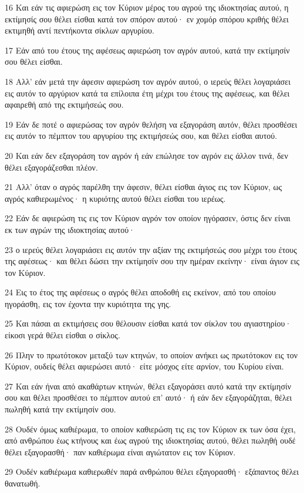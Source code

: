 \par 16 Και εάν τις αφιερώση εις τον Κύριον μέρος του αγρού της ιδιοκτησίας αυτού, η εκτίμησίς σου θέλει είσθαι κατά τον σπόρον αυτού· εν χομόρ σπόρου κριθής θέλει εκτιμηθή αντί πεντήκοντα σίκλων αργυρίου.
\par 17 Εάν από του έτους της αφέσεως αφιερώση τον αγρόν αυτού, κατά την εκτίμησίν σου θέλει είσθαι.
\par 18 Αλλ' εάν μετά την άφεσιν αφιερώση τον αγρόν αυτού, ο ιερεύς θέλει λογαριάσει εις αυτόν το αργύριον κατά τα επίλοιπα έτη μέχρι του έτους της αφέσεως, και θέλει αφαιρεθή από της εκτιμήσεώς σου.
\par 19 Εάν δε ποτέ ο αφιερώσας τον αγρόν θελήση να εξαγοράση αυτόν, θέλει προσθέσει εις αυτόν το πέμπτον του αργυρίου της εκτιμήσεώς σου, και θέλει είσθαι αυτού.
\par 20 Και εάν δεν εξαγοράση τον αγρόν ή εάν επώλησε τον αγρόν εις άλλον τινά, δεν θέλει εξαγοράζεσθαι πλέον.
\par 21 Αλλ' όταν ο αγρός παρέλθη την άφεσιν, θέλει είσθαι άγιος εις τον Κύριον, ως αγρός καθιερωμένος· η κυριότης αυτού θέλει είσθαι του ιερέως.
\par 22 Εάν δε αφιερώση τις εις τον Κύριον αγρόν τον οποίον ηγόρασεν, όστις δεν είναι εκ των αγρών της ιδιοκτησίας αυτού·
\par 23 ο ιερεύς θέλει λογαριάσει εις αυτόν την αξίαν της εκτιμήσεώς σου μέχρι του έτους της αφέσεως· και θέλει δώσει την εκτίμησίν σου την ημέραν εκείνην· είναι άγιον εις τον Κύριον.
\par 24 Εις το έτος της αφέσεως ο αγρός θέλει αποδοθή εις εκείνον, από του οποίου ηγοράσθη, εις τον έχοντα την κυριότητα της γης.
\par 25 Και πάσαι αι εκτιμήσεις σου θέλουσιν είσθαι κατά τον σίκλον του αγιαστηρίου· είκοσι γερά θέλει είσθαι ο σίκλος.
\par 26 Πλην το πρωτότοκον μεταξύ των κτηνών, το οποίον ανήκει ως πρωτότοκον εις τον Κύριον, ουδείς θέλει αφιερώσει αυτό· είτε μόσχος είτε αρνίον, του Κυρίου είναι.
\par 27 Και εάν ήναι από ακαθάρτων κτηνών, θέλει εξαγοράσει αυτό κατά την εκτίμησίν σου και θέλει προσθέσει το πέμπτον αυτού επ' αυτό· ή εάν δεν εξαγοράζηται, θέλει πωληθή κατά την εκτίμησίν σου.
\par 28 Ουδέν όμως καθιέρωμα, το οποίον καθιερώση τις εις τον Κύριον εκ των όσα έχει, από ανθρώπου έως κτήνους και έως αγρού της ιδιοκτησίας αυτού, θέλει πωληθή ουδέ θέλει εξαγορασθή· παν καθιέρωμα είναι αγιώτατον εις τον Κύριον.
\par 29 Ουδέν καθιέρωμα καθιερωθέν παρά ανθρώπου θέλει εξαγορασθή· εξάπαντος θέλει θανατωθή.
